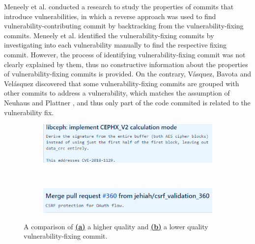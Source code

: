 \documentclass[12pt, a4paper]{report}
\begin{document}
Meneely et al. \cite{meneely_2013} conducted a research to study the properties of commits that
introduce vulnerabilities, in which a reverse approach was used to find vulnerability-contributing
commit by backtracking from the vulnerability-fixing commits. Meneely et al. identified the
vulnerability-fixing commits by investigating into each vulnerability manually to find the
respective fixing commit. However, the process of identifying vulnerability-fixing commit was not
clearly explained by them, thus no constructive information about the properties of
vulnerability-fixing commits is provided. On the contrary, V{\'a}squez, Bavota and Vel{\'a}squez
\cite{linares_2017} discovered that some vulnerability-fixing commits are grouped with other commits
to address a vulnerability, which matches the assumption of Neuhaus and Plattner
\cite{neuhaus_2013}, and thus only part of the code commited is related to the vulnerability fix.

\begin{figure}[H]
  \centering
  \begin{subfigure}{\textwidth}
    \centering
    \includegraphics[width=\textwidth]{images/vuln_fixing_commit_good_ex.png}
    \label{figure:g_vfc}
  \end{subfigure} \\
\end{figure}
\begin{figure}[H]\ContinuedFloat
  \begin{subfigure}{\textwidth}
    \centering
    \includegraphics[width=\textwidth]{images/vuln_fixing_commit_bad_ex.png}
    \label{figure:bad_vfc}
  \end{subfigure}
  \caption[Examples of vulnerability-fixing commit.]%
  {A comparison of \hyperref[figure:g_vfc]{\textbf{(a)}} a higher quality and
    \hyperref[figure:bad_vfc]{\textbf{(b)}} a lower quality vulnerability-fixing
    commit.}
  \label{figure:comparion_vfc}
\end{figure}
\end{document}
